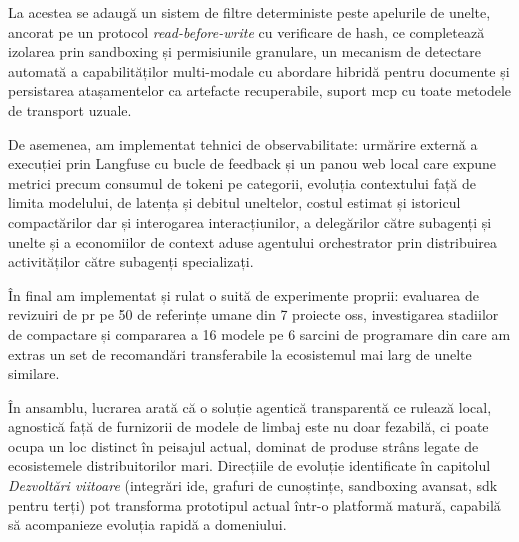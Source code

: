 \documentclass[12pt, a4paper, oneside, romanian]{teza-upb}
\begin{document}
  La acestea se adaugă un sistem de filtre
  deterministe peste apelurile de unelte, ancorat pe un protocol \emph{read-before-write} cu verificare de hash,
  ce completează izolarea prin sandboxing și permisiunile granulare, un mecanism de detectare
  automată a capabilităților multi-modale cu abordare hibridă pentru documente și persistarea atașamentelor ca
  artefacte recuperabile, suport \ac{mcp} cu toate metodele de transport uzuale.
  
  De asemenea, am implementat tehnici de observabilitate: urmărire externă a execuției prin Langfuse cu bucle de feedback
  și un panou web local care expune metrici precum consumul de tokeni
  pe categorii, evoluția contextului față de limita modelului, de latența și debitul uneltelor, costul estimat și
  istoricul compactărilor dar și interogarea interacțiunilor, a delegărilor către subagenți și unelte și a 
  economiilor de context aduse agentului orchestrator prin distribuirea activităților către subagenți specializați. 
  
  În final am implementat și rulat o suită de experimente proprii: evaluarea de revizuiri de \ac{pr} pe 50
  de referințe umane din 7 proiecte \ac{oss}, investigarea stadiilor de compactare și
  compararea a 16 modele pe 6 sarcini de programare din care am extras un set de recomandări
  transferabile la ecosistemul mai larg de unelte similare.

  În ansamblu, lucrarea arată că o soluție agentică transparentă ce rulează local, agnostică față de furnizorii de modele de limbaj
  este nu doar fezabilă, ci poate ocupa un loc
  distinct în peisajul actual, dominat de produse strâns legate de ecosistemele distribuitorilor
  mari. Direcțiile de evoluție identificate în capitolul \emph{Dezvoltări viitoare} (integrări
  \ac{ide}, grafuri de cunoștințe, sandboxing avansat, \ac{sdk} pentru terți)
  pot transforma prototipul actual într-o platformă matură, capabilă să acompanieze evoluția
  rapidă a domeniului.


\let\oldthebibliography\thebibliography
\renewcommand{\thebibliography}[1]{%
  \oldthebibliography{#1}%
  \footnotesize
  \setlength{\itemsep}{0pt}%
  \setlength{\parsep}{0pt}%
}






\end{document}
